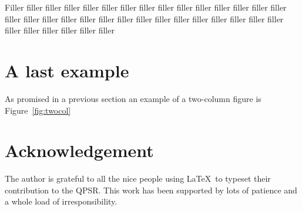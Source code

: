 \documentclass{fonetik}
\begin{document}
Filler filler filler filler filler filler filler filler filler
filler filler filler filler filler filler filler filler filler
filler filler filler filler filler filler filler filler filler
filler filler filler filler filler filler filler filler filler

\section{A last example}
As promised in a previous section an example of a
two-column figure is Figure~\ref{fig:twocol}

\section{Acknowledgement}
The author is grateful to all the nice people using \LaTeX\ to typeset
their contribution to the QPSR. This work has been supported by lots
of patience and a whole load of irresponsibility.




\end{document}
